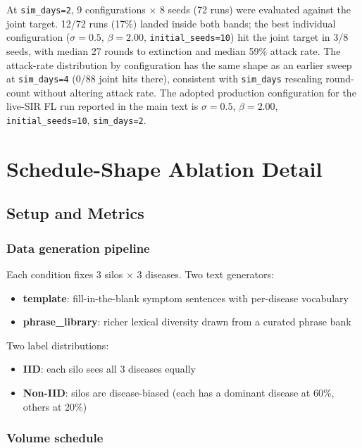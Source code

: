 \documentclass[utf8]{frontiers_suppmat} %
\begin{document}
At \texttt{sim\_days=2}, 9 configurations $\times$ 8 seeds (72 runs) were
evaluated against the joint target. 12/72 runs (17\%) landed inside both
bands; the best individual configuration ($\sigma=0.5$, $\beta=2.00$,
\texttt{initial\_seeds=10}) hit the joint target in 3/8 seeds, with median
27 rounds to extinction and median 59\% attack rate. The attack-rate
distribution by configuration has the same shape as an earlier sweep at
\texttt{sim\_days=4} (0/88 joint hits there), consistent with
\texttt{sim\_days} rescaling round-count without altering attack rate. The
adopted production configuration for the live-SIR FL run reported in the
main text is $\sigma=0.5$, $\beta=2.00$, \texttt{initial\_seeds=10},
\texttt{sim\_days=2}.


\section{Schedule-Shape Ablation Detail}
\label{sec:supp-schedule-ablation}

\subsection{Setup and Metrics}

\subsubsection{Data generation pipeline}

Each condition fixes 3 silos $\times$ 3 diseases. Two text generators:
\begin{itemize}
  \item \textbf{template}: fill-in-the-blank symptom sentences with per-disease vocabulary
  \item \textbf{phrase\_library}: richer lexical diversity drawn from a curated phrase bank
\end{itemize}

Two label distributions:
\begin{itemize}
  \item \textbf{IID}: each silo sees all 3 diseases equally
  \item \textbf{Non-IID}: silos are disease-biased (each has a dominant disease at 60\%, others at 20\%)
\end{itemize}

\subsubsection{Volume schedule}
\end{document}
